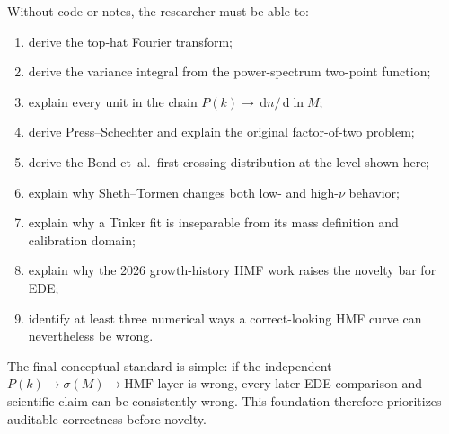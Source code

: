 \documentclass[11pt]{article}
\newcommand{\dd}{\,\mathrm d}
\begin{document}
Without code or notes, the researcher must be able to:
\begin{enumerate}
\item derive the top-hat Fourier transform;
\item derive the variance integral from the power-spectrum two-point function;
\item explain every unit in the chain $P(k)\rightarrow\dd n/\dd\ln M$;
\item derive Press--Schechter and explain the original factor-of-two problem;
\item derive the Bond et~al.\ first-crossing distribution at the level shown here;
\item explain why Sheth--Tormen changes both low- and high-$\nu$ behavior;
\item explain why a Tinker fit is inseparable from its mass definition and calibration domain;
\item explain why the 2026 growth-history HMF work raises the novelty bar for EDE;
\item identify at least three numerical ways a correct-looking HMF curve can nevertheless be wrong.
\end{enumerate}

The final conceptual standard is simple: if the independent $P(k)\rightarrow\sigma(M)\rightarrow\mathrm{HMF}$ layer is wrong, every later EDE comparison and scientific claim can be consistently wrong. This foundation therefore prioritizes auditable correctness before novelty.



\end{document}
